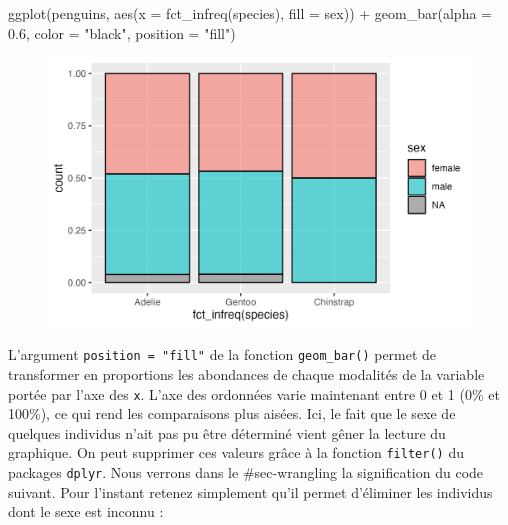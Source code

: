 \documentclass[
  letterpaper,
  DIV=11,
  numbers=noendperiod]{scrreprt}
\newenvironment{Shaded}{\begin{snugshade}}{\end{snugshade}}
\newcommand{\AttributeTok}[1]{\textcolor[rgb]{0.40,0.45,0.13}{#1}}
\newcommand{\FloatTok}[1]{\textcolor[rgb]{0.68,0.00,0.00}{#1}}
\newcommand{\FunctionTok}[1]{\textcolor[rgb]{0.28,0.35,0.67}{#1}}
\newcommand{\NormalTok}[1]{\textcolor[rgb]{0.00,0.23,0.31}{#1}}
\newcommand{\SpecialCharTok}[1]{\textcolor[rgb]{0.37,0.37,0.37}{#1}}
\newcommand{\StringTok}[1]{\textcolor[rgb]{0.13,0.47,0.30}{#1}}
\begin{document}
\begin{Shaded}
\begin{Highlighting}[]
\FunctionTok{ggplot}\NormalTok{(penguins, }\FunctionTok{aes}\NormalTok{(}\AttributeTok{x =} \FunctionTok{fct\_infreq}\NormalTok{(species), }\AttributeTok{fill =}\NormalTok{ sex)) }\SpecialCharTok{+}
  \FunctionTok{geom\_bar}\NormalTok{(}\AttributeTok{alpha =} \FloatTok{0.6}\NormalTok{, }\AttributeTok{color =} \StringTok{"black"}\NormalTok{, }\AttributeTok{position =} \StringTok{"fill"}\NormalTok{)}
\end{Highlighting}
\end{Shaded}

\begin{figure}[H]

{\centering \includegraphics{./03-visualization_files/figure-pdf/unnamed-chunk-56-1.png}

}

\end{figure}

L'argument \texttt{position\ =\ "fill"} de la fonction
\texttt{geom\_bar()} permet de transformer en proportions les abondances
de chaque modalités de la variable portée par l'axe des \texttt{x}.
L'axe des ordonnées varie maintenant entre 0 et 1 (0\% et 100\%), ce qui
rend les comparaisons plus aisées. Ici, le fait que le sexe de quelques
individus n'ait pas pu être déterminé vient gêner la lecture du
graphique. On peut supprimer ces valeurs grâce à la fonction
\texttt{filter()} du packages \texttt{dplyr}. Nous verrons dans le
\#sec-wrangling la signification du code suivant. Pour l'instant retenez
simplement qu'il permet d'éliminer les individus dont le sexe est
inconnu :
\end{document}
